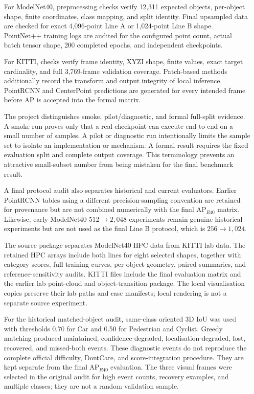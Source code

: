 For ModelNet40, preprocessing checks verify 12,311 expected objects, per-object shape, finite coordinates, class mapping, and split identity. Final upsampled data are checked for exact 4,096-point Line A or 1,024-point Line B shape. PointNet++ training logs are audited for the configured point count, actual batch tensor shape, 200 completed epochs, and independent checkpoints.

For KITTI, checks verify frame identity, XYZI shape, finite values, exact target cardinality, and full 3,769-frame validation coverage. Patch-based methods additionally record the transform and output integrity of local inference. PointRCNN and CenterPoint predictions are generated for every intended frame before AP is accepted into the formal matrix.

The project distinguishes smoke, pilot/diagnostic, and formal full-split evidence. A smoke run proves only that a real checkpoint can execute end to end on a small number of samples. A pilot or diagnostic run intentionally limits the sample set to isolate an implementation or mechanism. A formal result requires the fixed evaluation split and complete output coverage. This terminology prevents an attractive small-subset number from being mistaken for the final benchmark result.

A final protocol audit also separates historical and current evaluators. Earlier PointRCNN tables using a different precision-sampling convention are retained for provenance but are not combined numerically with the final AP$_{R40}$ matrix. Likewise, early ModelNet40 $512\rightarrow2,048$ experiments remain genuine historical experiments but are not used as the final Line B protocol, which is $256\rightarrow1,024$.

\label{sec:visual-provenance}
The source package separates ModelNet40 HPC data from KITTI lab data.
The retained HPC arrays include both lines for eight selected shapes,
together with category scores, full training curves, per-object geometry,
paired summaries, and reference-sensitivity audits. KITTI files include
the final evaluation matrix and the earlier lab point-cloud and
object-transition package. The local visualisation copies preserve
their lab paths and case manifests; local rendering is not a separate
source experiment.

For the historical matched-object audit, same-class oriented 3D IoU
was used with thresholds 0.70 for Car and 0.50 for Pedestrian and Cyclist.
Greedy matching produced maintained, confidence-degraded,
localisation-degraded, lost, recovered, and missed-both events.
These diagnostic events do not reproduce the complete official
difficulty, DontCare, and score-integration procedure. They are kept
separate from the final AP$_{R40}$ evaluation. The three visual frames
were selected in the original audit for high event counts, recovery
examples, and multiple classes; they are not a random validation sample.


